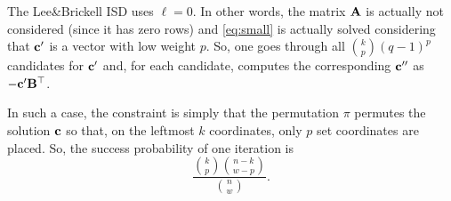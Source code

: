 The Lee\&Brickell ISD uses $\ell = 0$.
In other words, the matrix $\mathbf A$ is actually not considered (since it has zero rows) and \eqref{eq:small} is actually solved considering that $\mathbf c'$ is a vector with low weight $p$.
So, one goes through all $\binom{k}{p}(q-1)^p$ candidates for $\mathbf c'$ and, for each candidate, computes the corresponding $\mathbf c''$ as $-\mathbf c'\mathbf B^\top$.

In such a case, the constraint is simply that the permutation $\pi$ permutes the solution $\mathbf c$ so that, on the leftmost $k$ coordinates, only $p$ set coordinates are placed.
So, the success probability of one iteration is 
$$\frac{\binom{k}{p}\binom{n-k}{w-p}}{\binom{n}{w}}.$$
